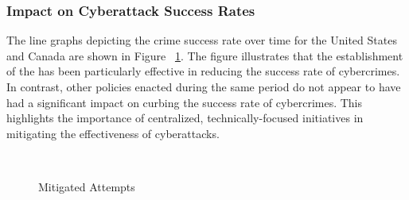     \subsubsection*{Impact on Cyberattack Success Rates} %
        The line graphs depicting the crime success rate over time for the United States and Canada are shown in Figure
        ~\ref{fig:mitigated-attempts}.
        The figure illustrates that the establishment of the 
        has been particularly effective in reducing the success rate of cybercrimes.
        In contrast, other policies enacted during the same period do not appear to have had a significant impact
        on curbing the success rate of cybercrimes.
        This highlights the importance of centralized, technically-focused initiatives in mitigating the effectiveness of cyberattacks.
        \begin{figure}[htb]
            \centering
            \hfill
            \\
            \caption{Mitigated Attempts}\label{fig:mitigated-attempts}
        \end{figure}

